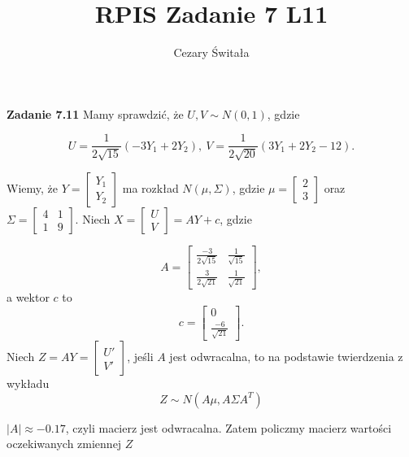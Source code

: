 \documentclass[12pt,a4paper]{article}
\title{RPIS Zadanie 7 L11}
\author{Cezary Świtała}
\begin{document}
\noindent
\textbf{Zadanie 7.11} Mamy sprawdzić, że \( U,V \sim N(0,1) \), gdzie

\[
	U = \frac{1}{2 \sqrt{15}} (-3Y_1 + 2Y_2),\ V = \frac{1}{2\sqrt{20}} (3Y_1 + 2Y_2 - 12).
\]

\noindent
Wiemy, że \( Y = \left[ \begin{array}{cc}
	Y_1 \\
	Y_2
\end{array} \right] \) ma rozkład \( N(\mu, \Sigma) \), gdzie \( \mu = \left[ \begin{array}{cc}
	2 \\
	3
\end{array} \right] \) oraz \( \Sigma = \left[ \begin{array}{cc}
	4 & 1 \\
	1 & 9
\end{array} \right] \).
Niech \(X = \left[ \begin{array}{c}
	U \\
	V
\end{array} \right]  = AY + c \), gdzie 

\[
	A = \left[ \begin{array}{cc}
			\frac{-3}{2\sqrt{15}} & \frac{1}{\sqrt{15}} \\
			\frac{3}{2\sqrt{21}}  & \frac{1}{\sqrt{21}} 
		\end{array}	 \right],
\]
a wektor $c$ to
\[
	c = \left[ \begin{array}{c}
			0 \\
			\frac{-6}{\sqrt{21}}
		\end{array}	 \right].
\]
Niech \( Z = AY = \left[ \begin{array}{c}
	U' \\
	V'
\end{array} \right] \), jeśli \(A\) jest odwracalna, to na podstawie twierdzenia z wykładu
\[ 
	Z \sim N(A\mu, A \Sigma A^T) 
\] 

\noindent
\( |A| \approx -0.17 \), czyli macierz jest odwracalna. Zatem policzmy macierz wartości oczekiwanych zmiennej \( Z \)
\end{document}
